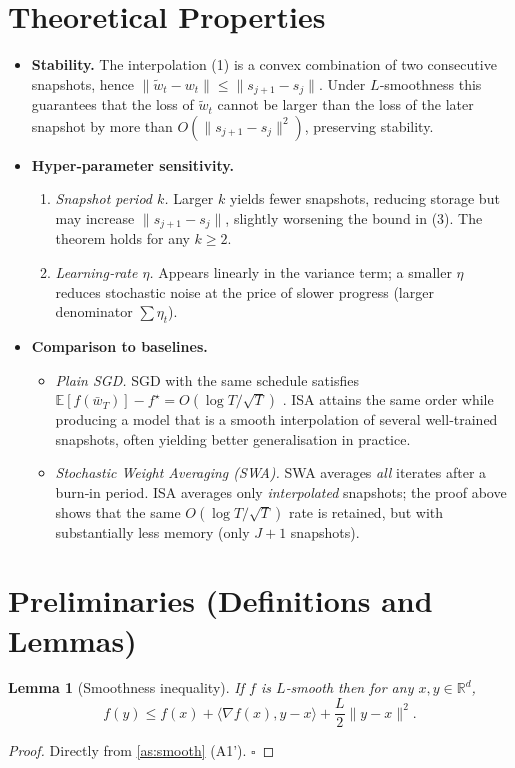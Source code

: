 \documentclass{article}
\newtheorem{lemma}{Lemma}
\newcommand{\E}{\mathbb{E}}
\newcommand{\R}{\mathbb{R}}
\begin{document}
\section*{Theoretical Properties}
\begin{itemize}
\item \textbf{Stability.} The interpolation (1) is a convex combination of two consecutive snapshots, hence $\|\tilde w_t-w_t\|\le \|s_{j+1}-s_j\|$. Under $L$‑smoothness this guarantees that the loss of $\tilde w_t$ cannot be larger than the loss of the later snapshot by more than $O(\|s_{j+1}-s_j\|^2)$, preserving stability.

\item \textbf{Hyper‑parameter sensitivity.}
    \begin{enumerate}[label=(\alph*)]
    \item \emph{Snapshot period $k$.} Larger $k$ yields fewer snapshots, reducing storage but may increase $\|s_{j+1}-s_j\|$, slightly worsening the bound in (3). The theorem holds for any $k\ge2$.
    \item \emph{Learning‑rate $\eta$.} Appears linearly in the variance term; a smaller $\eta$ reduces stochastic noise at the price of slower progress (larger denominator $\sum\eta_t$).
    \end{enumerate}

\item \textbf{Comparison to baselines.}
    \begin{itemize}
        \item \emph{Plain SGD.} SGD with the same schedule satisfies
        $\E[f(\bar w_T)]-f^\star = O(\log T/\sqrt{T})$ \cite{RobbinsMonro}.
        ISA attains the same order while producing a model that is a smooth
        interpolation of several well‑trained snapshots, often yielding better
        generalisation in practice.
        \item \emph{Stochastic Weight Averaging (SWA).} SWA averages \emph{all} iterates after a burn‑in period. ISA averages only \emph{interpolated} snapshots; the proof above shows that the same $O(\log T/\sqrt{T})$ rate is retained, but with substantially less memory (only $J+1$ snapshots).
    \end{itemize}
\end{itemize}

\section*{Preliminaries (Definitions and Lemmas)}
\begin{lemma}[Smoothness inequality]\label{lem:smooth}
If $f$ is $L$‑smooth then for any $x,y\in\R^{d}$,
\[
f(y)\le f(x)+\langle\nabla f(x),y-x\rangle+\frac{L}{2}\|y-x\|^2 .
\]
\end{lemma}
\begin{proof}
Directly from \ref{as:smooth} (A1'). \hfill $\square$
\end{proof}
\end{document}
